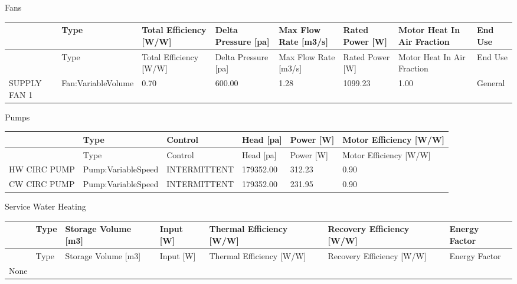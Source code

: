 Fans

{\scriptsize
\begin{longtable}[c]{>{\raggedright}p{0.75in}>{\raggedright}p{0.75in}>{\raggedright}p{0.75in}>{\raggedright}p{0.75in}>{\raggedright}p{0.75in}>{\raggedright}p{0.75in}>{\raggedright}p{0.75in}>{\raggedright}p{0.75in}}
\toprule 
~ & Type & Total Efficiency [W/W] & Delta Pressure [pa] & Max Flow Rate [m3/s] & Rated Power [W] & Motor Heat In Air Fraction & End Use \tabularnewline
\midrule
\endfirsthead

\toprule 
~ & Type & Total Efficiency [W/W] & Delta Pressure [pa] & Max Flow Rate [m3/s] & Rated Power [W] & Motor Heat In Air Fraction & End Use \tabularnewline
\midrule
\endhead

SUPPLY FAN 1 & Fan:VariableVolume & 0.70 & 600.00 & 1.28 & 1099.23 & 1.00 & General \tabularnewline
\bottomrule
\end{longtable}}

Pumps

{\scriptsize
\begin{longtable}[c]{>{\raggedright}p{1.0in}>{\raggedright}p{1.0in}>{\raggedright}p{1.0in}>{\raggedright}p{1.0in}>{\raggedright}p{1.0in}>{\raggedright}p{1.0in}}
\toprule 
~ & Type & Control & Head [pa] & Power [W] & Motor Efficiency [W/W] \tabularnewline
\midrule
\endfirsthead

\toprule 
~ & Type & Control & Head [pa] & Power [W] & Motor Efficiency [W/W] \tabularnewline
\midrule
\endhead

HW CIRC PUMP & Pump:VariableSpeed & INTERMITTENT & 179352.00 & 312.23 & 0.90 \tabularnewline
CW CIRC PUMP & Pump:VariableSpeed & INTERMITTENT & 179352.00 & 231.95 & 0.90 \tabularnewline
\bottomrule
\end{longtable}}

Service Water Heating

\begin{longtable}[c]{>{\raggedright}p{0.85in}>{\raggedright}p{0.85in}>{\raggedright}p{0.85in}>{\raggedright}p{0.85in}>{\raggedright}p{0.85in}>{\raggedright}p{0.85in}>{\raggedright}p{0.85in}}
\toprule 
~ & Type & Storage Volume [m3] & Input [W] & Thermal Efficiency [W/W] & Recovery Efficiency [W/W] & Energy Factor \tabularnewline
\midrule
\endfirsthead

\toprule 
~ & Type & Storage Volume [m3] & Input [W] & Thermal Efficiency [W/W] & Recovery Efficiency [W/W] & Energy Factor \tabularnewline
\midrule
\endhead

None & ~ & ~ & ~ & ~ & ~ & ~ \tabularnewline
\bottomrule
\end{longtable}
